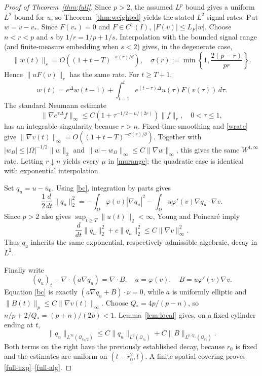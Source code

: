 \documentclass[final,5p,times,twocolumn]{elsarticle}
\newcommand{\Om}{\Omega}
\newcommand{\norm}[1]{\lVert#1\rVert}
\newcommand{\ubar}{\overline u_0}
\begin{document}
\begin{proof}[Proof of Theorem~\ref{thm:full}]
Since $p>2$, the assumed $L^p$ bound gives a uniform $L^2$ bound for $u$, so Theorem~\ref{thm:weighted} yields the stated $L^2$ signal rates. Put $w=v-v_*$. Since $F(v_*)=0$ and $F\in C^1(I)$, $|F(v)|\le L_F|w|$. Choose $n<r<p$ and $s$ by $1/r=1/p+1/s$. Interpolation with the bounded signal range (and finite-measure embedding when $s<2$) gives, in the degenerate case,
\begin{equation}\label{wrate}
\norm{w(t)}_s=O((1+t-T)^{-\sigma(r)/\theta}),\quad
\sigma(r):=\min\left\{1,\frac{2(p-r)}{pr}\right\}.
\end{equation}
Hence $\norm{uF(v)}_r$ has the same rate. For $t\ge T+1$,
\[
w(t)=e^{\Delta}w(t-1)+\int_{t-1}^t e^{(t-\tau)\Delta}u(\tau)F(v(\tau))\,d\tau.
\]
The standard Neumann estimate \cite{KeLiWang2022}
\[
\norm{\nabla e^{\tau\Delta}f}_\infty
\le C(1+\tau^{-1/2-n/(2r)})\norm f_r,
\quad0<\tau\le1,
\]
has an integrable singularity because $r>n$. Fixed-time smoothing and \eqref{wrate} give $\norm{\nabla v(t)}_\infty=O((1+t-T)^{-\sigma(r)/\theta})$. Together with $|w_\Om|\le|\Om|^{-1/2}\norm w_2$ and $\norm{w-w_\Om}_\infty\le C\norm{\nabla w}_\infty$, this gives the same $W^{1,\infty}$ rate. Letting $r\downarrow n$ yields every $\mu$ in \eqref{murange}; the quadratic case is identical with exponential interpolation.

Set $q_u=u-\ubar$. Using \eqref{bc}, integration by parts gives
\[
\frac12\frac d{dt}\norm{q_u}_2^2
=-\int_\Om\varphi(v)|\nabla q_u|^2
-\int_\Om u\varphi'(v)\nabla q_u\cdot\nabla v.
\]
Since $p>2$ also gives $\sup_{t\ge T}\norm{u(t)}_2<\infty$, Young and Poincar\'e imply
\begin{equation}\label{cellL2}
\frac d{dt}\norm{q_u}_2^2+c\norm{q_u}_2^2
\le C\norm{\nabla v}_\infty^2.
\end{equation}
Thus $q_u$ inherits the same exponential, respectively admissible algebraic, decay in $L^2$.

Finally write
\[
(q_u)_t-\nabla\cdot(a\nabla q_u)=\nabla\cdot B,
\quad a=\varphi(v),\quad B=u\varphi'(v)\nabla v.
\]
Equation \eqref{bc} is exactly $(a\nabla q_u+B)\cdot\nu=0$, while $a$ is uniformly elliptic and $\norm{B(t)}_p\le C\norm{\nabla v(t)}_\infty$. Choose $Q_*=4p/(p-n)$, so $n/p+2/Q_*=(p+n)/(2p)<1$. Lemma~\ref{lem:local} gives, on a fixed cylinder ending at $t$,
\[
\norm{q_u}_{L^\infty(\mathcal Q_{r_0/2})}
\le C\norm{q_u}_{L^2(\mathcal Q_{r_0})}
+C\norm B_{L^{p,Q_*}(\mathcal Q_{r_0})}.
\]
Both terms on the right have the previously established decay, because $r_0$ is fixed and the estimates are uniform on $(t-r_0^2,t)$. A finite spatial covering proves \eqref{full-exp}--\eqref{full-alg}.
\end{proof}
\end{document}
